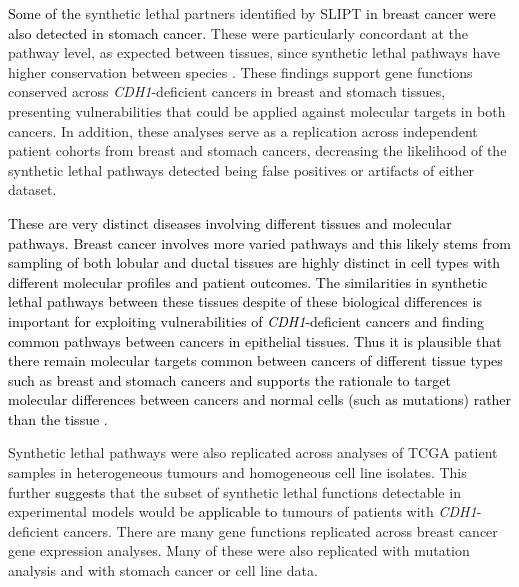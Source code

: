 \textcolor{black}{Some of the} \gls{synthetic lethal} partners identified by \gls{SLIPT} \textcolor{black}{in breast cancer were also detected in stomach cancer}. These were particularly concordant at the \gls{pathway} level, as expected between tissues, since \gls{synthetic lethal} \glspl{pathway} have higher conservation between species \citep{Dixon2008}. These findings support gene functions conserved across \textit{CDH1}-deficient cancers in breast and stomach tissues, presenting vulnerabilities that could be applied against molecular targets in both cancers. In addition, these analyses serve as a replication across independent patient cohorts from breast and stomach cancers, decreasing the likelihood of the \gls{synthetic lethal} \glspl{pathway} detected being false positives or artifacts of either dataset.

\textcolor{black}{
These are very distinct diseases involving different tissues and molecular pathways. Breast cancer involves more varied pathways and this likely stems from sampling of both lobular and ductal tissues are highly distinct in cell types with different molecular profiles and patient outcomes. The similarities in synthetic lethal pathways between these tissues despite of these biological differences is important for exploiting vulnerabilities of \textit{CDH1}-deficient cancers and finding common pathways between cancers in epithelial tissues. Thus it is plausible that there remain molecular targets common between cancers of different tissue types such as breast and stomach cancers and supports the rationale to target molecular differences between cancers and normal cells (such as mutations) rather than the tissue \citep{Perou2000, Parker2009, Vogelstein2013, Hanahan2000}. 
}

Synthetic lethal \glspl{pathway} were also replicated across  analyses of \gls{TCGA} patient samples in heterogeneous tumours and homogeneous cell line isolates. This further \textcolor{black}{suggests} that the subset of \gls{synthetic lethal} functions detectable in experimental models \citep{Chen2014, Telford2015} would be \textcolor{black}{applicable to} tumours of patients with \textit{CDH1}-deficient cancers.
%
There are many gene functions replicated across breast cancer \gls{gene expression} analyses. Many of these were also replicated with \gls{mutation} analysis and with stomach cancer or cell line  data. %

